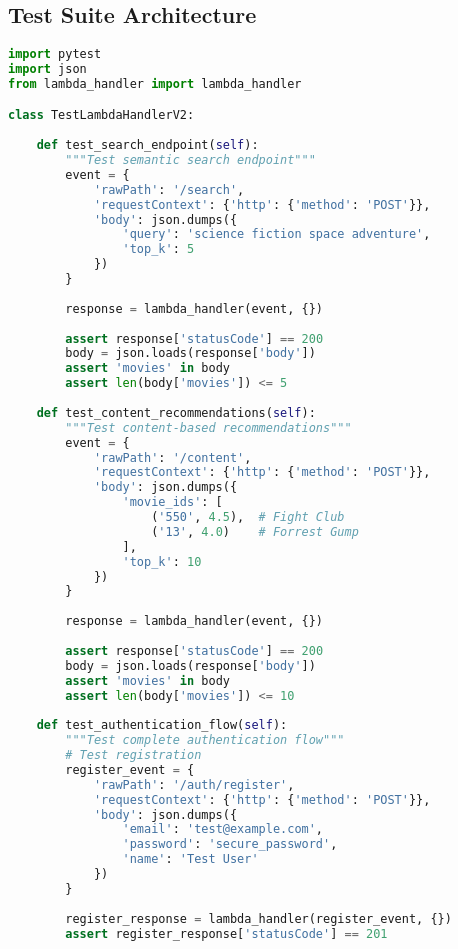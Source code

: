 \documentclass[11pt,a4paper]{article}
\begin{document}
\subsection{Test Suite Architecture}
\begin{lstlisting}[language=Python, caption=Test Lambda Handler]
import pytest
import json
from lambda_handler import lambda_handler

class TestLambdaHandlerV2:
    
    def test_search_endpoint(self):
        """Test semantic search endpoint"""
        event = {
            'rawPath': '/search',
            'requestContext': {'http': {'method': 'POST'}},
            'body': json.dumps({
                'query': 'science fiction space adventure',
                'top_k': 5
            })
        }
        
        response = lambda_handler(event, {})
        
        assert response['statusCode'] == 200
        body = json.loads(response['body'])
        assert 'movies' in body
        assert len(body['movies']) <= 5
    
    def test_content_recommendations(self):
        """Test content-based recommendations"""
        event = {
            'rawPath': '/content',
            'requestContext': {'http': {'method': 'POST'}},
            'body': json.dumps({
                'movie_ids': [
                    ('550', 4.5),  # Fight Club
                    ('13', 4.0)    # Forrest Gump
                ],
                'top_k': 10
            })
        }
        
        response = lambda_handler(event, {})
        
        assert response['statusCode'] == 200
        body = json.loads(response['body'])
        assert 'movies' in body
        assert len(body['movies']) <= 10
    
    def test_authentication_flow(self):
        """Test complete authentication flow"""
        # Test registration
        register_event = {
            'rawPath': '/auth/register',
            'requestContext': {'http': {'method': 'POST'}},
            'body': json.dumps({
                'email': 'test@example.com',
                'password': 'secure_password',
                'name': 'Test User'
            })
        }
        
        register_response = lambda_handler(register_event, {})
        assert register_response['statusCode'] == 201
        

\end{lstlisting}
\end{document}
